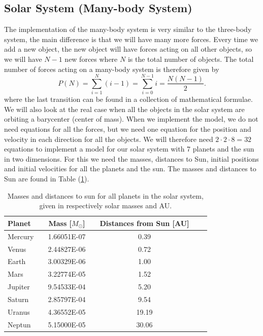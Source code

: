 \documentclass[norsk,a4paper,12pt]{article}
\begin{document}
\subsection{Solar System (Many-body System)}
The implementation of the many-body system is very similar to the three-body system, the main difference is that we will have many more forces. Every time we add a new object, the new object will have forces acting on all other objects, so we will have $N-1$ new forces where $N$ is the total number of objects. The total number of forces acting on a many-body system is therefore given by
\begin{equation}
P(N)=\sum_{i=1}^N(i-1)=\sum_{i=0}^{N-1}i=\frac{N(N-1)}{2}.
\end{equation}
where the last transition can be found in a collection of mathematical formulae.  We will also look at the real case when all the objects in the solar system are orbiting a barycenter (center of mass). When we implement the model, we do not need equations for all the forces, but we need one equation for the position and velocity in each direction for all the objects. We will therefore need $2\cdot2\cdot8=32$ equations to implement a model for our solar system with 7 planets and the sun in two dimensions. For this we need the masses, distances to Sun, initial positions and initial velocities for all the planets and the sun. The masses and distances to Sun are found in Table (\ref{tab:Masses}).
\begin{table}[H]
\centering
\caption{Masses and distances to sun for all planets in the solar system, given in respectively solar masses and AU.}
\label{tab:Masses} 
\begin{tabularx}{\textwidth}{lXcccXr}
\toprule
Planet  &   & Mass [$M_\odot$] &    & Distances from Sun [AU] \\
\midrule
Mercury 	&	& 1.66051E-07  &    & 0.39    \\
Venus   &   & 2.44827E-06  &    & 0.72    \\
Earth   &   & 3.00329E-06  &    & 1.00    \\
Mars    &   & 3.22774E-05  &    & 1.52    \\
Jupiter &   & 9.54533E-04  &    & 5.20    \\
Saturn 	&	& 2.85797E-04  &    & 9.54    \\
Uranus 	&	& 4.36552E-05  &    & 19.19   \\
Neptun  &	& 5.15000E-05  &    & 30.06   \\
\bottomrule
\end{tabularx}
\end{table}
\end{document}
